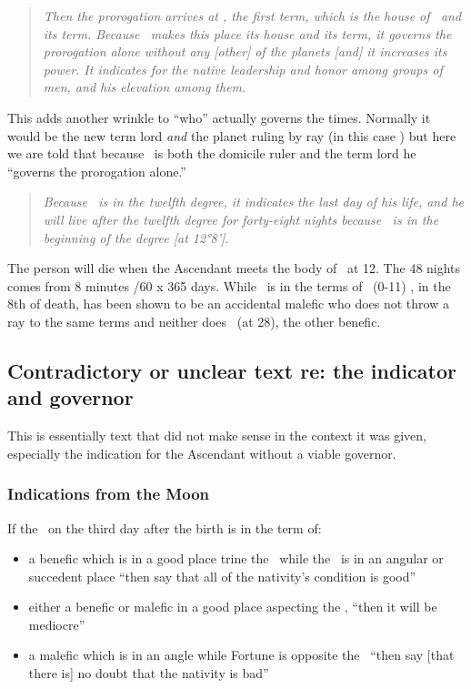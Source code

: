 \begin{quote}
\textsl{Then the prorogation arrives at \Sagittarius, the first term, which is the house of \Jupiter\, and its term. Because \Jupiter\, makes this place its house and its term, it governs the prorogation alone without any [other] of the planets [and] it increases its power. It indicates for the native leadership and honor among groups of men, and his elevation among them.}
\end{quote}

This adds another wrinkle to ``who'' actually governs the times. Normally it would be the new term lord \textsl{and} the planet ruling by ray (in this case \Venus) but here we are told that because \Jupiter\, is both the domicile ruler and the term lord he ``governs the prorogation alone.''

\begin{quote}
\textsl{Because \Saturn\, is in the twelfth degree, it indicates the last day of his life, and he will live after the twelfth degree for forty-eight nights because \Saturn\, is in the beginning of the degree [at 12°8'].}
\end{quote}

The person will die when the Ascendant meets the body of \Saturn\, at 12\Sagittarius. The 48 nights comes from 8 minutes /60 x 365 days. While \Saturn\, is in the terms of \Jupiter\, (0-11\Sagittarius) \Jupiter, in the 8th of death, has been shown to be an accidental malefic who does not throw a ray to the same terms and neither does \Venus\, (at 28\Leo), the other benefic.

\newpage
\subsection{Contradictory or unclear text re: the indicator and governor}
\begin{mdframed}[backgroundcolor=cyan!5, rightmargin=1em, leftmargin=1em]
This is essentially text that did not make sense in the context it was given, especially the indication for the Ascendant without a viable governor.
\end{mdframed}

\subsubsection{Indications from the Moon}
If  the \Moon\, on the third day after the birth is in the term of:

\begin{itemize}[topsep=0em,itemsep=0em]
\item a benefic which is in a good place trine the \Moon\, while the \Moon\, is in an angular or succedent place ``then say that all of the nativity's condition is good''

\item either  a benefic or malefic in a good place aspecting the \Moon, ``then it will be mediocre''

\item a  malefic which is in an angle while Fortune is opposite the \Moon\, ``then say [that there is] no doubt that the nativity is bad''
\end{itemize}

